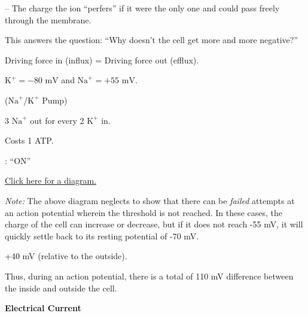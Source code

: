 \begin{coloredlist}
\begin{coloredlist}
\begin{coloredlist}
\begin{coloredlist}
                \item {} -- The charge the ion ``perfers'' if it were the only one and could pass freely through the membrane.
                \begin{coloredlist}
                    \item This answers the question: ``Why doesn't the cell get more and more negative?''
                    \item Driving force in (influx) = Driving force out (efflux).
                    \item \(\text{K}^+ = -80 \text{ mV}\) and \(\text{Na}^+ = +55 \text{ mV}\).
                \end{coloredlist}
            \end{coloredlist}
            \item {} (\(\text{Na}^{+}\)/\(\text{K}^{+}\) Pump)
            \begin{coloredlist}
                \item 3 \(\text{Na}^{+}\) out for every 2 \(\text{K}^{+}\) in.
                \item Costs 1 ATP.
            \end{coloredlist}
        \end{coloredlist}
    \end{coloredlist}
    \item {}: ``ON'' 
    \begin{coloredlist}
        \item \hyperref[action potential]{Click here for a diagram.}
        \begin{coloredlist}
            \item \textit{Note:} The above diagram neglects to show that there can be \textit{failed} attempts at an action potential wherein the threshold is not reached. In these cases, the charge of the cell can increase or decrease, but if it does not reach -55 mV, it will quickly settle back to its resting potential of -70 mV.
        \end{coloredlist}
        \item +40 mV (relative to the outside).
        \item Thus, during an action potential, there is a total of 110 mV difference between the inside and outside the cell.
        \item \textbf{Electrical Current}
        \begin{coloredlist}
            \item {}

\end{coloredlist}
\end{coloredlist}
\end{coloredlist}
